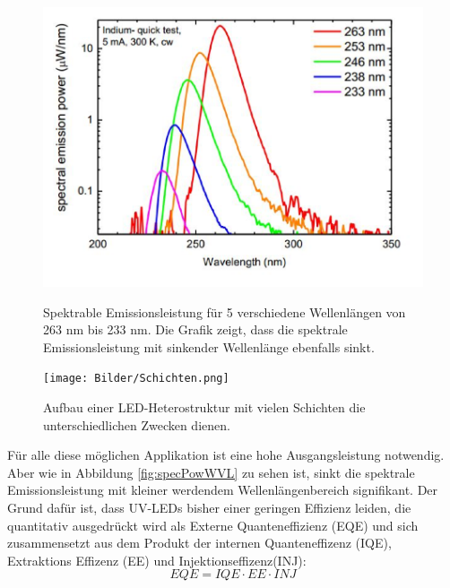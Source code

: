\begin{figure}[htb]
    \centering
    \begin{minipage}[t]{0.49\linewidth}
        \centering
        \includegraphics[width=\linewidth]{Bilder/SpectralEmissionPower_Wavelength.png}
        \caption{Spektrable Emissionsleistung für 5 verschiedene Wellenlängen von 263 nm bis 233 nm. Die Grafik zeigt, dass die spektrale Emissionsleistung mit sinkender Wellenlänge ebenfalls sinkt\cite{semreich}.}
        \label{fig:specPowWVL}
    \end{minipage}
    \hfill
    \begin{minipage}[t]{0.49\linewidth}
        \centering
        \texttt{[image: Bilder/Schichten.png]}
        \caption{Aufbau einer LED-Heterostruktur mit vielen Schichten die unterschiedlichen Zwecken dienen.}
        \label{fig:schichtenLED}
    \end{minipage}
\end{figure}
\noindent
%
Für alle diese möglichen Applikation ist eine hohe Ausgangsleistung notwendig. Aber wie in Abbildung \ref{fig:specPowWVL} zu sehen ist, sinkt die spektrale Emissionsleistung mit kleiner werdendem Wellenlängenbereich signifikant. Der Grund dafür ist, dass UV-LEDs bisher einer geringen Effizienz leiden, die quantitativ ausgedrückt wird als Externe Quanteneffizienz (EQE) und sich zusammensetzt aus dem Produkt der internen Quanteneffizenz (IQE), Extraktions Effizenz (EE) und Injektionseffizenz(INJ):
%
\begin{equation}
    EQE = IQE \cdot EE \cdot INJ
\end{equation}
%
